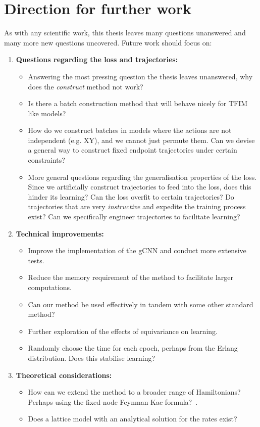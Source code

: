 \section{Direction for further work}
As with any scientific work, this thesis leaves many questions unanswered and many more new questions uncovered. Future work should focus on:

\begin{enumerate}
	\item \textbf{Questions regarding the loss and trajectories:} 
	\begin{itemize}
		\item Answering the most pressing question the thesis leaves unanswered, why does the \emph{construct} method not work?
		
		\item Is there a batch construction method that will behave nicely for TFIM like models?
		
		\item How do we construct batches in models where the actions are not independent (e.g. XY), and we cannot just permute them. Can we devise a general way to construct fixed endpoint trajectories under certain constraints?

		\item More general questions regarding the generalisation properties of the loss. Since we artificially construct trajectories to feed into the loss, does this hinder its learning? Can the loss overfit to certain trajectories? Do trajectories that are very \emph{instructive} and expedite the training process exist? Can we specifically engineer trajectories to facilitate learning?
	
	\end{itemize}
	
	\item \textbf{Technical improvements:}
	\begin{itemize}
		\item Improve the implementation of the gCNN and conduct more extensive tests.
		\item Reduce the memory requirement of the method to facilitate larger computations. 
		\item Can our method be used effectively in tandem with some other standard method?
		\item Further exploration of the effects of equivariance on learning.
		\item Randomly choose the time for each epoch, perhaps from the Erlang distribution. Does this stabilise learning?
	\end{itemize}
	
	\item \textbf{Theoretical considerations:}
	\begin{itemize}
		\item How can we extend the method to a broader range of Hamiltonians? Perhaps using the fixed-node Feynman-Kac formula?~\cite{caffarel2015talking}.
		\item Does a lattice model with an analytical solution for the rates exist?
	\end{itemize}

\end{enumerate}







